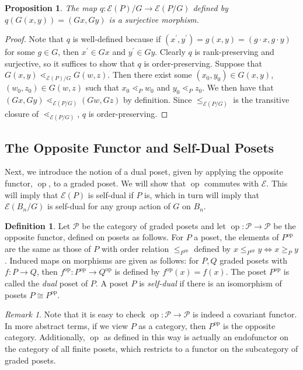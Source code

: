 \documentclass[smallextended, envcountsame, numbook]{svjour3}
\theoremstyle{plain}
\newtheorem{prop}[thm]{Proposition}
\theoremstyle{definition}
\newtheorem{defn}[thm]{Definition}
\theoremstyle{remark}
\newtheorem{rmk}[thm]{Remark}
\numberwithin{equation}{section}
\newcommand\ssec{\subsection}
\renewcommand{\iff}{\Leftrightarrow}
\newcommand\op{\operatorname{op}}
\begin{document}
\begin{prop}\label{prop:surjection_between_F_quotients}
The map $q\colon \mathcal E(P)/G\rightarrow \mathcal E(P/G)$ defined by $q(G(x, y)) = (Gx,Gy)$ is a surjective morphism.
\end{prop}

\begin{proof}

Note that $q$ is well-defined because if $(x^\prime, y^\prime) = g(x, y) = (g\cdot x, g\cdot y)$ for some $g\in G$, then $x^\prime\in Gx$ and $y^\prime\in Gy$.  Clearly $q$ is rank-preserving and surjective, so it suffices to show that $q$ is order-preserving.  Suppose that $G(x, y) \lessdot_{\mathcal E(P)/G} G(w, z)$.  Then there exist some $(x_0, y_0)\in G(x, y)$, $(w_0, z_0)\in G(w, z)$ such that $x_0\lessdot_P w_0$ and $y_0\lessdot_P z_0$.  We then have that $(Gx, Gy) \lessdot_{\mathcal E(P/G)} (Gw, Gz)$ by definition. Since $\le_{\mathcal E(P/G)}$ is the transitive closure of $\lessdot_{\mathcal E(P/G)}$, $q$ is order-preserving.
\end{proof}

\ssec{The Opposite Functor and Self-Dual Posets}
\label{ssec:dual_posets}

Next, we introduce the notion of a dual poset, given by applying the opposite functor, $\op$, to a graded poset. We will show that $\op$ commutes with $\mathcal E$. This will imply that $\mathcal E(P)$ is self-dual if $P$ is, which in turn will imply that $\mathcal E(B_n/G)$ is self-dual for any group action of $G$ on $B_n$.

\begin{defn}
Let $\mathcal P$ be the category of graded posets and let $\op\colon\mathcal P \rightarrow \mathcal P$ be the opposite functor, defined on posets as follows. For $P$ a poset, the elements of $P^{\op}$ are the same as those of $P$ with order relation $\le_{P^{\op}}$ defined by $x \leq_{P^{\op}} y \iff x \geq_P y$. Induced maps on morphisms are given as follows: for $P,Q$ graded posets with $f\colon P \rightarrow Q$, then $f^{\op}\colon P^{\op} \rightarrow Q^{\op}$ is defined by $f^{\op}(x) = f(x)$. The poset $P^{\op}$ is called the {\it dual} poset of $P$. A poset $P$ is {\it self-dual} if there is an isomorphism of posets $P \cong P^{\op}$.
\end{defn}

\begin{rmk}
Note that it is easy to check $\op\colon\mathcal P \rightarrow \mathcal P$ is indeed a covariant functor. In more abstract terms, if we view $P$ as a category, then $P^{\op}$ is the opposite category. Additionally, $\op$ as defined in this way is actually an endofunctor on the category of all finite posets, which restricts to a functor on the subcategory of graded posets.
\end{rmk}
\end{document}
